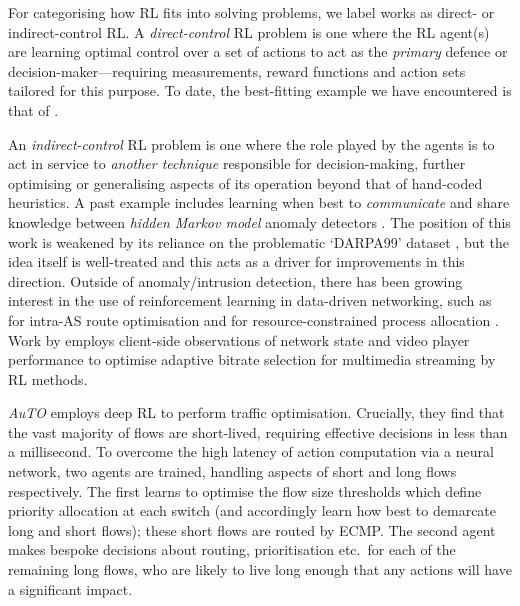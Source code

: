 \documentclass[10pt, times, conference, letterpaper]{IEEEtran}
\begin{document}
For categorising how RL fits into solving problems, we label works as direct- or indirect-control RL.
A \emph{direct-control} RL problem is one where the RL agent(s) are learning optimal control over a set of actions to act as the \emph{primary} defence or decision-maker---requiring measurements, reward functions and action sets tailored for this purpose.
To date, the best-fitting example we have encountered is that of \textcite{DBLP:journals/eaai/MalialisK15}.

An \emph{indirect-control} RL problem is one where the role played by the agents is to act in service to \emph{another technique} responsible for decision-making, further optimising or generalising aspects of its operation beyond that of hand-coded heuristics.
A past example includes learning when best to \emph{communicate} and share knowledge between \emph{hidden Markov model} anomaly detectors \cite{DBLP:conf/paisi/XuSH07}.
The position of this work is weakened by its reliance on the problematic `DARPA99' dataset \cite{DBLP:conf/sp/SommerP10}, but the idea itself is well-treated and this acts as a driver for improvements in this direction.
Outside of anomaly/intrusion detection, there has been growing interest in the use of reinforcement learning in data-driven networking, such as for intra-AS route optimisation \cite{DBLP:conf/hotnets/ValadarskySST17} and for resource-constrained process allocation \cite{DBLP:conf/hotnets/MaoAMK16}.
Work by \textcite{DBLP:conf/sigcomm/MaoNA17} employs client-side observations of network state and video player performance to optimise adaptive bitrate selection for multimedia streaming by RL methods.

\emph{AuTO} \cite{DBLP:conf/sigcomm/ChenL0L18} employs deep RL to perform traffic optimisation.
Crucially, they find that the vast majority of flows are short-lived, requiring effective decisions in less than a millisecond.
To overcome the high latency of action computation via a neural network, two agents are trained, handling aspects of short and long flows respectively.
The first learns to optimise the flow size thresholds which define priority allocation at each switch (and accordingly learn how best to demarcate long and short flows); these short flows are routed by ECMP.
The second agent makes bespoke decisions about routing, prioritisation etc.\ for each of the remaining long flows, who are likely to live long enough that any actions will have a significant impact.
\end{document}
